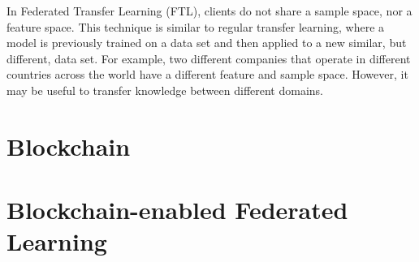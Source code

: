 In Federated Transfer Learning (FTL), clients do not share a sample space, nor a feature space. This technique is similar to regular transfer learning, where a model is previously trained on a data set and then applied to a new similar, but different, data set. For example, two different companies that operate in different countries across the world have a different feature and sample space. However, it may be useful to transfer knowledge between different domains.

\section{Blockchain}


\cite{nakamoto2009bitcoin}


\section{Blockchain-enabled Federated Learning}

